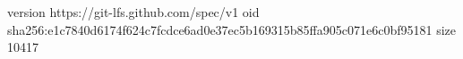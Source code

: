 version https://git-lfs.github.com/spec/v1
oid sha256:e1c7840d6174f624c7fcdce6ad0e37ec5b169315b85ffa905c071e6c0bf95181
size 10417
